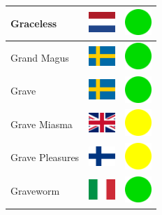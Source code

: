 \documentclass[12pt, a4paper, twoside]{report}
\begin{document}
\begin{center}
\begin{longtable}{|p{5cm}|p{2cm}|p{2cm}|}
 Graceless                                                  & \includegraphics[width=1cm]{../4x3/nl} &   \includegraphics[width=1cm]{../likes/y} \\ \hline
 Grand Magus                                                & \includegraphics[width=1cm]{../4x3/se} &   \includegraphics[width=1cm]{../likes/y} \\ \hline
 Grave                                                      & \includegraphics[width=1cm]{../4x3/se} &   \includegraphics[width=1cm]{../likes/y} \\ \hline
 Grave Miasma                                               & \includegraphics[width=1cm]{../4x3/gb} &   \includegraphics[width=1cm]{../likes/m} \\ \hline
 Grave Pleasures                                            & \includegraphics[width=1cm]{../4x3/fi} &   \includegraphics[width=1cm]{../likes/m} \\ \hline
 Graveworm                                                  & \includegraphics[width=1cm]{../4x3/it} &   \includegraphics[width=1cm]{../likes/y} \\ \hline

\end{longtable}
\end{center}
\end{document}
